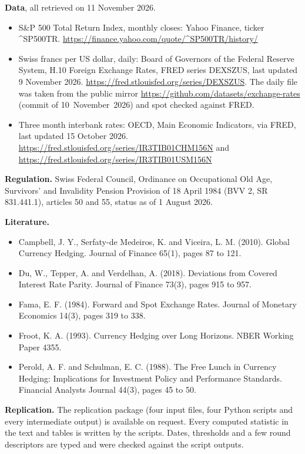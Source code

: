 \documentclass[a4paper,fontsize=10.2pt,parskip=half-]{scrartcl}
\newcommand{\lead}[1]{\textbf{#1}}
\begin{document}
{\small
\lead{Data}, all retrieved on 11 November 2026.
\begin{itemize}
\item S\&P 500 Total Return Index, monthly closes: Yahoo Finance, ticker \textasciicircum SP500TR. \url{https://finance.yahoo.com/quote/^SP500TR/history/}
\item Swiss francs per US dollar, daily: Board of Governors of the Federal Reserve System, H.10 Foreign Exchange Rates, FRED series DEXSZUS, last updated 9 November 2026. \url{https://fred.stlouisfed.org/series/DEXSZUS}. The daily file was taken from the public mirror \url{https://github.com/datasets/exchange-rates} (commit of 10~November~2026) and spot checked against FRED.
\item Three month interbank rates: OECD, Main Economic Indicators, via FRED, last updated 15 October 2026. \url{https://fred.stlouisfed.org/series/IR3TIB01CHM156N} and \url{https://fred.stlouisfed.org/series/IR3TIB01USM156N}
\end{itemize}
\lead{Regulation.} Swiss Federal Council, Ordinance on Occupational Old Age, Survivors' and Invalidity Pension Provision of 18 April 1984 (BVV 2, SR 831.441.1), articles 50 and 55, status as of 1 August 2026.

\lead{Literature.}
\begin{itemize}
\item Campbell, J. Y., Serfaty-de Medeiros, K. and Viceira, L. M. (2010). Global Currency Hedging. Journal of Finance 65(1), pages 87 to 121.
\item Du, W., Tepper, A. and Verdelhan, A. (2018). Deviations from Covered Interest Rate Parity. Journal of Finance 73(3), pages 915 to 957.
\item Fama, E. F. (1984). Forward and Spot Exchange Rates. Journal of Monetary Economics 14(3), pages 319 to 338.
\item Froot, K. A. (1993). Currency Hedging over Long Horizons. NBER Working Paper 4355.
\item Perold, A. F. and Schulman, E. C. (1988). The Free Lunch in Currency Hedging: Implications for Investment Policy and Performance Standards. Financial Analysts Journal 44(3), pages 45 to 50.
\end{itemize}
\lead{Replication.} The replication package (four input files, four Python scripts and every intermediate output) is available on request. Every computed statistic in the text and tables is written by the scripts. Dates, thresholds and a few round descriptors are typed and were checked against the script outputs.
}
\end{document}
